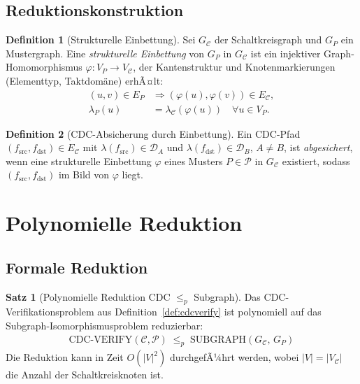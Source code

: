 ﻿\documentclass[a4paper,12pt]{article}
\theoremstyle{definition}
\newtheorem{definition}{Definition}
\newtheorem{satz}{Satz}
\begin{document}
	\subsection{Reduktionskonstruktion}
	
	\begin{definition}[Strukturelle Einbettung]
		Sei $G_{\mathcal{C}}$ der Schaltkreisgraph und $G_P$ ein Mustergraph.
		Eine \emph{strukturelle Einbettung} von $G_P$ in $G_{\mathcal{C}}$ ist ein
		injektiver Graph-Homomorphismus $\varphi: V_P \to V_{\mathcal{C}}$, der
		Kantenstruktur und Knotenmarkierungen (Elementtyp, Taktdom\"ane) erhÃ¤lt:
		\begin{align}
			(u,v) \in E_P &\Rightarrow (\varphi(u), \varphi(v)) \in E_{\mathcal{C}}, \\
			\lambda_P(u)   &= \lambda_{\mathcal{C}}(\varphi(u)) \quad \forall u \in V_P.
		\end{align}
	\end{definition}
	
	\begin{definition}[CDC-Absicherung durch Einbettung]
		Ein CDC-Pfad $(f_{\mathrm{src}}, f_{\mathrm{dst}}) \in E_{\mathcal{C}}$ mit
		$\lambda(f_{\mathrm{src}}) \in \mathcal{D}_A$ und $\lambda(f_{\mathrm{dst}}) \in \mathcal{D}_B$,
		$A \neq B$, ist \emph{abgesichert}, wenn eine strukturelle Einbettung
		$\varphi$ eines Musters $P \in \mathcal{P}$ in $G_{\mathcal{C}}$ existiert,
		sodass $(f_{\mathrm{src}}, f_{\mathrm{dst}})$ im Bild von $\varphi$ liegt.
	\end{definition}
	
	\section{Polynomielle Reduktion}
	
	\subsection{Formale Reduktion}
	
	\begin{satz}[Polynomielle Reduktion CDC $\leq_p$ Subgraph]
		\label{satz:reduktion}
		Das CDC-Verifikationsproblem aus Definition~\ref{def:cdcverify} ist
		polynomiell auf das Subgraph-Isomorphismusproblem reduzierbar:
		\begin{align*}
		\mathrm{CDC\text{-}VERIFY}(\mathcal{C}, \mathcal{P}) \;\leq_p\;
		\mathrm{SUBGRAPH}(G_{\mathcal{C}},\, G_P)
		\end{align*}
		Die Reduktion kann in Zeit $O(|V|^2)$ durchgefÃ¼hrt werden, wobei
		$|V| = |V_{\mathcal{C}}|$ die Anzahl der Schaltkreisknoten ist.
	\end{satz}
	
\end{document}

